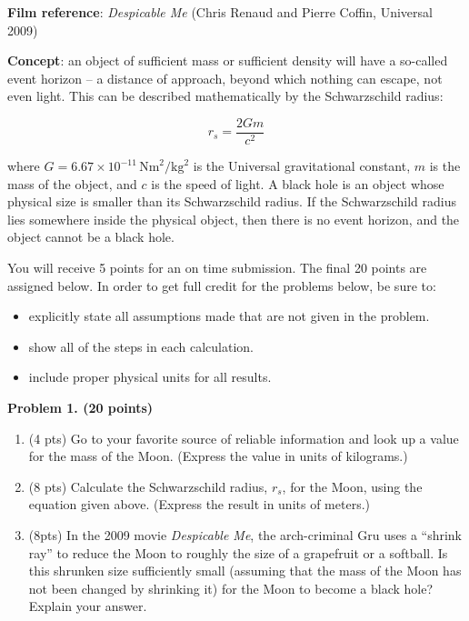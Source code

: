 \documentclass[12pt]{article}
\begin{document}
\vspace{1cm}
\noindent \textbf{Film reference}: \textit{Despicable Me} (Chris Renaud and Pierre Coffin, Universal 2009)

\noindent \textbf{Concept}: an object of sufficient mass or sufficient density will have a so-called event horizon – a distance of approach, beyond which nothing can escape, not even light. This can be described mathematically by the Schwarzschild radius:

\begin{equation}
r_s = \frac{2Gm}{c^2}
\end{equation}

\noindent where $G = 6.67 \times 10^{-11} \, \text{Nm}^2/\text{kg}^2$ is the Universal gravitational constant, $m$ is the mass of the object, and $c$ is the speed of light. A black hole is an object whose physical size is smaller than its Schwarzschild radius. If the Schwarzschild radius lies somewhere inside the physical object, then there is no event horizon, and the object cannot be a black hole.

\vspace{0.5cm}

\noindent You will receive 5 points for an on time submission. The final 20
points are assigned below. In order to get full credit for the problems below,
be sure to:
\begin{itemize}
    \item explicitly state all assumptions made that are not given in the
    problem.
    \vspace{-10pt}
    \item show all of the steps in each calculation.
    \vspace{-10pt}
    \item include proper physical units for all results.
\end{itemize}

\vspace{10pt}
\noindent \textbf{Problem 1. (20 points)} \begin{enumerate}
    \item[a)] (4 pts) Go to your favorite source of reliable information and look up a value for the mass of the Moon. (Express the value in units of kilograms.)
    
    \item[b)] (8 pts) Calculate the Schwarzschild radius, \( r_s \), for the Moon, using the equation given above. (Express the result in units of meters.)
    
    \item[c)] (8pts) In the 2009 movie \textit{Despicable Me}, the arch-criminal Gru uses a “shrink ray” to reduce the Moon to roughly the size of a grapefruit or a softball. Is this shrunken size sufficiently small (assuming that the mass of the Moon has not been changed by shrinking it) for the Moon to become a black hole? Explain your answer.
\end{enumerate}
\end{document}
